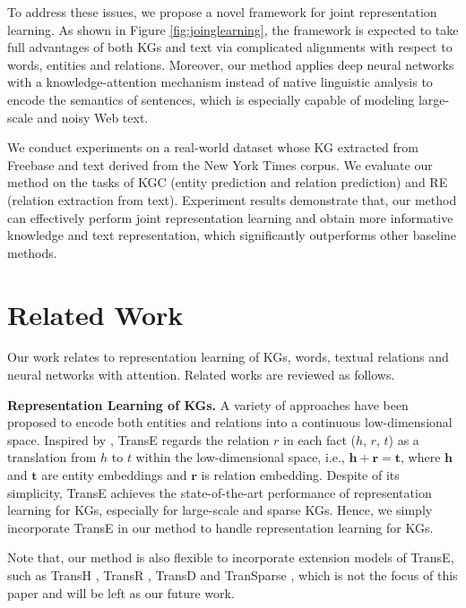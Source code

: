 \documentclass[11pt,a4paper]{article}
\begin{document}
To address these issues, we propose a novel framework for joint representation learning. As shown in Figure \ref{fig:joinglearning}, the framework is expected to take full advantages of both KGs and text via complicated alignments with respect to words, entities and relations. Moreover, our method applies deep neural networks with a knowledge-attention mechanism instead of native linguistic analysis to encode the semantics of sentences, which is especially capable of modeling large-scale and noisy Web text. 

We conduct experiments on a real-world dataset whose KG extracted from Freebase and text derived from the New York Times corpus. We evaluate our method on the tasks of KGC (entity prediction and relation prediction) and RE (relation extraction from text). Experiment results demonstrate that, our method can effectively perform joint representation learning and obtain more informative knowledge and text representation, which significantly outperforms other baseline methods.

\section{Related Work}
\label{sec:related}
Our work relates to representation learning of KGs, words, textual relations and neural networks with attention. Related works are reviewed as follows.

\textbf{Representation Learning of KGs.} A variety of approaches have been proposed to encode both entities and relations into a continuous low-dimensional space. Inspired by \cite{mikolov2013distributed}, TransE \cite{bordes2013translating} regards the relation $r$ in each fact ($h$, $r$, $t$) as a translation from $h$ to $t$ within the low-dimensional space, i.e., $\textbf{h} + \textbf{r} = \textbf{t}$, where $\textbf{h}$ and $\textbf{t}$ are entity embeddings and $\textbf{r}$ is relation embedding. Despite of its simplicity, TransE achieves the state-of-the-art performance of representation learning for KGs, especially for large-scale and sparse KGs. Hence, we simply incorporate TransE in our method to handle representation learning for KGs.

Note that, our method is also flexible to incorporate extension models of TransE, such as TransH \cite{wang2014transh}, TransR \cite{lin2015learning}, TransD \cite{ji2015knowledge} and TranSparse \cite{ji2016knowledge}, which is not the focus of this paper and will be left as our future work.
\end{document}
